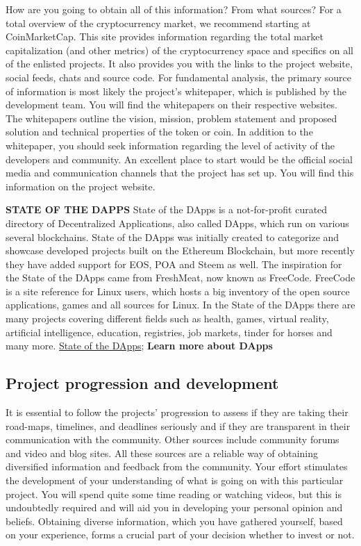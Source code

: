 How are you going to obtain all of this information? From what sources? For a total overview of the cryptocurrency market, we recommend starting at CoinMarketCap. This site provides information regarding the total market capitalization (and other metrics) of the cryptocurrency space and specifics on all of the enlisted projects. It also provides you with the links to the project website, social feeds, chats and source code. For fundamental analysis, the primary source of information is most likely the project's whitepaper, which is published by the development team. You will find the whitepapers on their respective websites. The whitepapers outline the vision, mission, problem statement and proposed solution and technical properties of the token or coin. In addition to the whitepaper, you should seek information regarding the level of activity of the developers and community. An excellent place to start would be the official social media and communication channels that the project has set up. You will find this information on the project website.

    \bigskip
    \begin{cryptobox}{\textbf{STATE OF THE DAPPS}}
        State of the DApps is a not-for-profit curated directory of Decentralized Applications, also called DApps, which run on various several blockchains. State of the DApps was initially created to categorize and showcase developed projects built on the Ethereum Blockchain, but more recently they have added support for EOS, POA and Steem as well. The inspiration for the State of the DApps came from FreshMeat, now known as FreeCode. FreeCode is a site reference for Linux users, which hosts a big inventory of the open source applications, games and all sources for Linux. In the State of the DApps there are many projects covering different fields such as health, games, virtual reality, artificial intelligence, education, registries, job markets, tinder for horses and many more. 
        \tcblower
        \href{https://www.stateofthedapps.com}{State of the DApps}; \textbf{Learn more about DApps}
    \end{cryptobox}
    \medskip

\subsection*{Project progression and development}
It is essential to follow the projects' progression to assess if they are taking their road-maps, timelines, and deadlines seriously and if they are transparent in their communication with the community. Other sources include community forums and video and blog sites. All these sources are a reliable way of obtaining diversified information and feedback from the community. Your effort stimulates the development of your understanding of what is going on with this particular project. You will spend quite some time reading or watching videos, but this is undoubtedly required and will aid you in developing your personal opinion and beliefs. Obtaining diverse information, which you have gathered yourself, based on your experience, forms a crucial part of your decision whether to invest or not.


